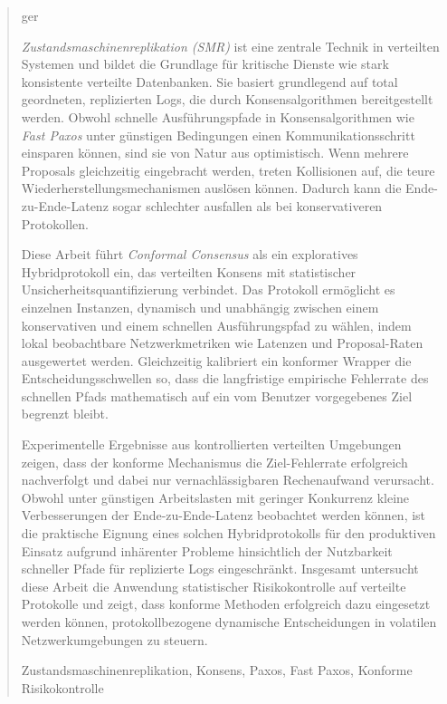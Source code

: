 \documentclass[english,bibtex]{kththesis}
\numberwithin{algorithm}{chapter}
\begin{document}
\cleardoublepage



\begin{abstract}
    \markboth{\abstractname}{}
    \begin{scontents}[store-env=lang]
        ger
    \end{scontents}
    \begin{scontents}[store-env=abstracts,print-env=true]
        \textit{Zustandsmaschinenreplikation (SMR)} ist eine zentrale Technik in verteilten Systemen und bildet die Grundlage für kritische Dienste wie stark konsistente verteilte Datenbanken. Sie basiert grundlegend auf total geordneten, replizierten Logs, die durch Konsensalgorithmen bereitgestellt werden. Obwohl schnelle Ausführungspfade in Konsensalgorithmen wie \textit{Fast Paxos} unter günstigen Bedingungen einen Kommunikationsschritt einsparen können, sind sie von Natur aus optimistisch. Wenn mehrere Proposals gleichzeitig eingebracht werden, treten Kollisionen auf, die teure Wiederherstellungsmechanismen auslösen können. Dadurch kann die Ende-zu-Ende-Latenz sogar schlechter ausfallen als bei konservativeren Protokollen.

        Diese Arbeit führt \textit{Conformal Consensus} als ein exploratives Hybridprotokoll ein, das verteilten Konsens mit statistischer Unsicherheitsquantifizierung verbindet. Das Protokoll ermöglicht es einzelnen Instanzen, dynamisch und unabhängig zwischen einem konservativen und einem schnellen Ausführungspfad zu wählen, indem lokal beobachtbare Netzwerkmetriken wie Latenzen und Proposal-Raten ausgewertet werden. Gleichzeitig kalibriert ein konformer Wrapper die Entscheidungsschwellen so, dass die langfristige empirische Fehlerrate des schnellen Pfads mathematisch auf ein vom Benutzer vorgegebenes Ziel begrenzt bleibt.

        Experimentelle Ergebnisse aus kontrollierten verteilten Umgebungen zeigen, dass der konforme Mechanismus die Ziel-Fehlerrate erfolgreich nachverfolgt und dabei nur vernachlässigbaren Rechenaufwand verursacht. Obwohl unter günstigen Arbeitslasten mit geringer Konkurrenz kleine Verbesserungen der Ende-zu-Ende-Latenz beobachtet werden können, ist die praktische Eignung eines solchen Hybridprotokolls für den produktiven Einsatz aufgrund inhärenter Probleme hinsichtlich der Nutzbarkeit schneller Pfade für replizierte Logs eingeschränkt. Insgesamt untersucht diese Arbeit die Anwendung statistischer Risikokontrolle auf verteilte Protokolle und zeigt, dass konforme Methoden erfolgreich dazu eingesetzt werden können, protokollbezogene dynamische Entscheidungen in volatilen Netzwerkumgebungen zu steuern.
    \end{scontents}


    \begin{scontents}[store-env=keywords,print-env=true]
        Zustandsmaschinenreplikation, Konsens, Paxos, Fast Paxos, Konforme Risikokontrolle
    \end{scontents}
\end{abstract}
\end{document}
